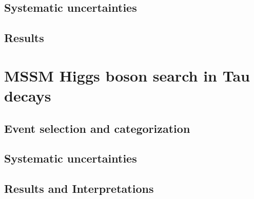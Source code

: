 \subsection{Systematic uncertainties}

\subsection{Results}

\section{MSSM Higgs boson search in Tau decays}

\subsection{Event selection and categorization}

\subsection{Systematic uncertainties}

\subsection{Results and Interpretations}


